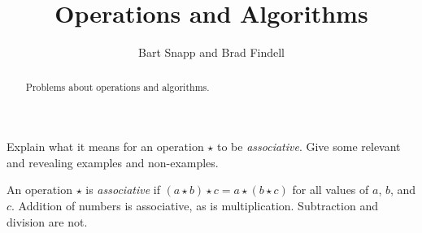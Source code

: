 \documentclass[nooutcomes]{ximera}
\title{Operations and Algorithms}
\author{Bart Snapp and Brad Findell}
\begin{document}
\begin{abstract}
Problems about operations and algorithms. 
\end{abstract}
\maketitle


\begin{problem}Explain what it means for an operation $\star$ to be
  \textit{associative}. Give some relevant and revealing examples and non-examples.
\begin{freeResponse}
\begin{hint}
An operation $\star$ is \textit{associative} if $(a\star b)\star c = a\star (b\star c)$ for all values of $a$, $b$, and $c$.  Addition of numbers is associative, as is multiplication.  Subtraction and division are not.  
\end{hint}
\end{freeResponse}
\end{problem} 
\end{document}
